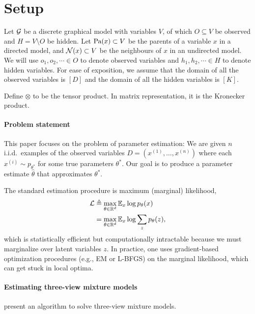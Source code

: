 \section{Setup}
\label{sec:setup}

Let $\mathcal{G}$ be a discrete graphical model with variables $V$, of which
  $O \subseteq V$ be observed and $H = V \setminus O$ be hidden.
Let $\textrm{Pa}(x) \subset V$ be the parents of a variable $x$ in a directed
  model, and $\mathcal{N}(x) \subset V$ be the neighbours of $x$ in an undirected
  model.
We will use $o_1, o_2, \cdots \in O$ to denote observed variables and
  $h_1, h_2, \cdots \in H$ to denote hidden variables.
For ease of exposition, we assume that the domain of all the observed
  variables is $[D]$ and the domain of all the hidden variables is
  $[K]$.

Define $\otimes$ to be the tensor product. In matrix representation, it
  is the Kronecker product.\expand

\paragraph{Problem statement}

This paper focuses on the problem of parameter estimation:
We are given $n$ i.i.d.~examples of the observed variables $D = (x^{(1)}, \dots, x^{(n)})$
where each $x^{(i)} \sim p_{\theta^*}$ for some true parameters $\theta^*$.
Our goal is to produce a parameter estimate $\hat\theta$ that approximates $\theta^*$.

The standard estimation procedure is maximum (marginal) likelihood,
  \begin{align*}
    \mathcal{L} &\triangleq \max_{\theta \in \mathbb{R}^d} \mathbb{E}_{x} \log p_\theta(x) \\
        &=      \max_{\theta \in \mathbb{R}^d} \mathbb{E}_{x} \log \sum_z p_\theta(z),
  \end{align*}
  which is statistically efficient but computationally intractable
  because we must marginalize over latent variables $z$.
In practice, one uses gradient-based optimization procedures (e.g., EM
  or L-BFGS) on the marginal likelihood, which can get stuck in local
  optima.

\paragraph{Estimating three-view mixture models}

\citet{anandkumar12moments} present an algorithm to solve three-view mixture models.

